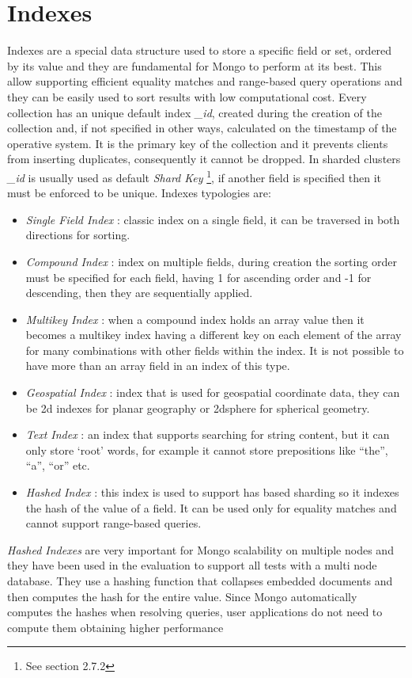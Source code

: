 \section{Indexes}
\label{sec:3}
Indexes are a special data structure used to store a specific field or set, ordered by its value and they are fundamental for Mongo to perform at its best. This allow supporting efficient equality matches and range-based query operations and they can be easily used to sort results with low computational cost.
Every collection has an unique default index \textit{\_id}, created during the creation of the collection and, if not specified in other ways, calculated on the timestamp of the operative system. It is the primary key of the collection and it prevents clients from inserting duplicates, consequently it cannot be dropped. 
In sharded clusters \textit{\_id} is usually used as default \textit{Shard Key} \footnote{See section 2.7.2}, if another field is specified then it must be enforced to be unique.
Indexes typologies are:
\begin{itemize}
	\item \textit{Single Field Index} : classic index on a single field, it can be traversed in both directions for sorting.
	\item \textit{Compound Index} : index on multiple fields, during creation the sorting order must be specified for each field, having 1 for ascending order and  -1 for descending, then they are sequentially applied.
	\item \textit{Multikey Index} : when a compound index holds an array value then it becomes a multikey index having a different key on each element of the array for many combinations with other fields within the index. It is not possible to have more than an array field in an index of this type.
	\item \textit{Geospatial Index} : index that is used for geospatial coordinate data, they can be 2d indexes for planar geography or 2dsphere for spherical geometry.
	\item \textit{Text Index} : an index that supports searching for string content, but it can only store ‘root’ words, for example it cannot store prepositions like “the”, “a”, “or” etc.
	\item \textit{Hashed Index} : this index is used to support has based sharding so it indexes the hash of the value of a field. It can be used only for equality matches and cannot support range-based queries.
\end{itemize}
\textit{Hashed Indexes} are very important for Mongo scalability on multiple nodes 
and they have been used in the evaluation to support all tests with a multi node database. They use a hashing function that collapses embedded documents and then computes the hash for the entire value.
Since Mongo automatically computes the hashes when resolving queries, user applications do not need to compute them obtaining higher performance

